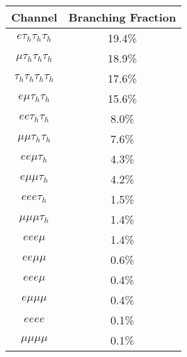 \begin{table}[h]
    \centering
    \begin{tabular}{|c|c|}
         \hline
         Channel & Branching Fraction  \\
         \hline
         \hline
         $e \tau_h \tau_h \tau_h$ & 19.4\% \\
         $\mu \tau_h \tau_h \tau_h$ & 18.9\% \\
         $\tau_h \tau_h \tau_h \tau_h$ & 17.6\% \\
         $e \mu \tau_h \tau_h$ & 15.6\% \\
         $e e \tau_h \tau_h$ & 8.0\% \\
         $\mu \mu \tau_h \tau_h$ & 7.6\% \\
         $e e \mu \tau_h$ & 4.3\% \\
         $e \mu \mu \tau_h$ & 4.2\% \\
         $e e e \tau_h$ & 1.5\% \\
         $\mu \mu \mu \tau_h$ & 1.4\% \\
         $e e e \mu$ & 1.4\% \\
         $e e \mu \mu$ & 0.6\% \\
         $e e e \mu$ & 0.4\% \\
         $e \mu \mu \mu$ & 0.4\% \\
         $e e e e$ & 0.1\% \\
         $\mu \mu \mu \mu$ & 0.1\% \\
         \hline
    \end{tabular}
    \caption{}
\end{table}

